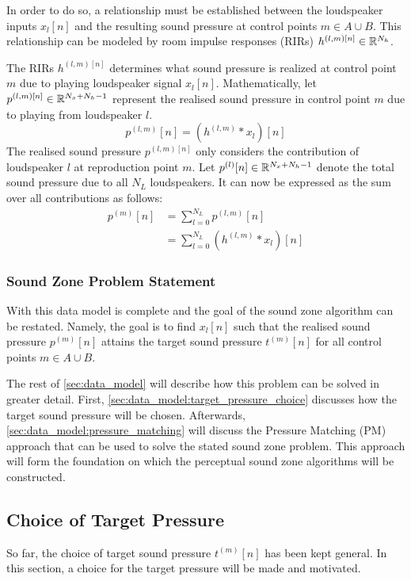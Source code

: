 In order to do so, a relationship must be established between the loudspeaker inputs $x_l[n]$
and the resulting sound pressure at control points $m\in A \cup B$. 
This relationship can be modeled by room impulse responses (RIRs) $h^{(l,m)[n]}\in\mathbb{R}^{N_h}$.

The RIRs $h^{(l,m)[n]}$ determines what sound pressure is realized at control point $m$ due to playing loudspeaker signal $x_l[n]$. 
Mathematically, let $p^{(l,m)[n]}\in\mathbb{R}^{N_x + N_h - 1}$ represent the realised sound pressure in control point $m$
due to playing from loudspeaker $l$.
\begin{equation}
    p^{(l,m)}[n] = \left(h^{(l,m)} \ast x_l\right)[n]
\end{equation}
The realised sound pressure $p^{(l,m)[n]}$ only considers the contribution of loudspeaker $l$ at reproduction point $m$.
Let $p^{(l)}[n]\in\mathbb{R}^{N_x + N_h - 1}$ denote the total sound pressure due to all $N_L$ loudspeakers.
It can now be expressed as the sum over all contributions as follows: 
\begin{align}
    p^{(m)}[n] &= \sum_{l=0}^{N_L} p^{(l,m)}[n] \\
               &= \sum_{l=0}^{N_L} \left(h^{(l,m)} \ast x_l\right)[n]
\end{align}

\subsubsection{Sound Zone Problem Statement}
With this data model is complete and the goal of the sound zone algorithm can be restated.
Namely, the goal is to find $x_l[n]$ such that the realised sound pressure $p^{(m)}[n]$ attains the
target sound pressure $t^{(m)}[n]$ for all control points $m\in A \cup B$.

The rest of \autoref{sec:data_model} will describe how this problem can be solved in greater detail.
First, \autoref{sec:data_model:target_pressure_choice} discusses how the target sound pressure will be chosen.
Afterwards, \autoref{sec:data_model:pressure_matching} will discuss the Pressure Matching (PM) approach 
that can be used to solve the stated sound zone problem. 
This approach will form the foundation on which the perceptual sound zone algorithms will be constructed.

\subsection{Choice of Target Pressure}
\label{sec:data_model:target_pressure_choice}
So far, the choice of target sound pressure $t^{(m)}[n]$ has been kept general. 
In this section, a choice for the target pressure will be made and motivated.


